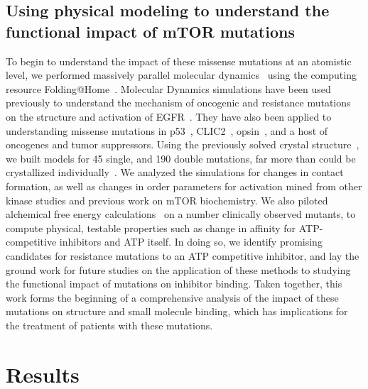 \documentclass[phd,tocprelim]{cornell}
\begin{document}
\subsection{Using physical modeling to understand the functional impact of mTOR mutations}
To begin to understand the impact of these missense mutations at an atomistic level, we performed massively parallel molecular dynamics~\citep{Salsbury:2010ij} using the computing resource Folding@Home~\citep{Shirts:2000du}. Molecular Dynamics simulations have been used previously to understand the mechanism of oncogenic and resistance mutations on the structure and activation of EGFR~\citep{Shan:2012bs,Sutto:2013gy}. They have also been applied to understanding missense mutations in p53~\citep{Demir:2011bc}, CLIC2~\citep{Witham:2011co}, opsin~\citep{Tsukamoto:2013gr}, and a host of oncogenes and tumor suppressors\citep{Stehr:2011ga}. Using the previously solved crystal structure~\citep{Yang:2013gaa}, we built models for 45 single, and 190 double mutations, far more than could be crystallized individually~\citep{Xu:2016fw}. We analyzed the simulations for changes in contact formation, as well as changes in order parameters for activation mined from other kinase studies and previous work on mTOR biochemistry. We also piloted alchemical free energy calculations~\citep{Chodera:Curr.Opin.Struct.Biol.:2011} on a number clinically observed mutants, to compute physical, testable properties such as change in affinity for ATP-competitive inhibitors and ATP itself. In doing so, we identify promising candidates for resistance mutations to an ATP competitive inhibitor, and lay the ground work for future studies on the application of these methods to studying the functional impact of mutations on inhibitor binding. Taken together, this work forms the beginning of a comprehensive analysis of the impact of these mutations on structure and small molecule binding, which has implications for the treatment of patients with these mutations. 

\section{Results}
\end{document}
